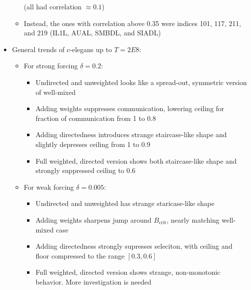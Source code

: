 \documentclass[openacc]{class/rsprocb_new}
\begin{document}
\begin{itemize}
\begin{itemize}
      (all had correlation $\approx \num{0.1}$)
    \item Instead, the ones with correlation above \num{0.35} were
      indices 101, 117, 211, and 219 (IL1L, AUAL, SMBDL, and SIADL)
  \end{itemize}
  \item General trends of c-elegans up to $T = 2E8$:
  \begin{itemize}
    \item For strong forcing $\delta = 0.2$:
    \begin{itemize}
      \item Undirected and unweighted looks like a spread-out, symmetric
        version of well-mixed
      \item Adding weights suppresses communication, lowering ceiling
        for fraction of communication from \num{1} to \num{0.8}
      \item Adding directedness introduces strange staircase-like shape
        and slightly depresses ceiling from \num{1} to \num{0.9}
      \item Full weighted, directed version shows both staircase-like
        shape and strongly suppressed ceiling to \num{0.6}
    \end{itemize}
    \item For weak forcing $\delta = 0.005$:
    \begin{itemize}
      \item Undirected and unweighted has strange staricase-like shape
      \item Adding weights sharpens jump around $B_\text{crit}$, nearly
        matching well-mixed case
      \item Adding directedness strongly supresses seleciton, with
        ceiling and floor compressed to the range $[0.3,0.6]$
      \item Full weighted, directed version shows strange, non-monotonic
        behavior. More investigation is needed
    \end{itemize}
  \end{itemize}
\end{itemize}




\end{document}
